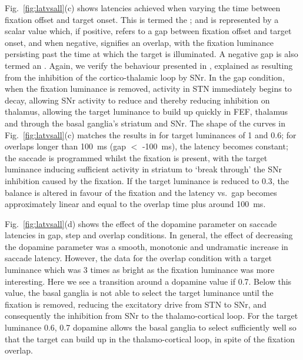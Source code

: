 \documentclass{frontiersSCNS}
\begin{document}
Fig.~\ref{fig:latvsall}(c) shows latencies achieved when varying the
time between fixation offset and target onset. This is termed
the ; and is represented by a scalar value which, if
positive, refers to a gap between fixation offset and target onset,
and when negative, signifies an overlap, with the fixation luminance
persisting past the time at which the target is illuminated. A
negative gap is also termed an .  Again, we verify the
behaviour presented in \cite{cope_basal_2017}, explained as resulting
from the inhibition of the cortico-thalamic loop by SNr. In the gap
condition, when the fixation luminance is removed, activity in STN
immediately begins to decay, allowing SNr activity to reduce and
thereby reducing inhibition on thalamus, allowing the target luminance
to build up quickly in FEF, thalamus and through the basal ganglia's
striatum and SNr. The shape of the curves in Fig.~\ref{fig:latvsall}(c)
matches the results in \cite{cope_basal_2017} for target luminances of
1 and 0.6; for overlaps longer than 100~ms (gap $<$ -100~ms), the
latency becomes constant; the saccade is programmed whilst the
fixation is present, with the target luminance inducing sufficient
activity in striatum to `break through' the SNr inhibition caused by
the fixation. If the target luminance is reduced to 0.3, the balance
is altered in favour of the fixation and the latency vs.~gap becomes
approximately linear and equal to the overlap time plus around 100~ms.

Fig.~\ref{fig:latvsall}(d) shows the effect of the dopamine parameter on
saccade latencies in gap, step and overlap conditions. In general, the
effect of decreasing the dopamine parameter was a smooth, monotonic
and undramatic increase in saccade latency. However, the data for the
overlap condition with a target luminance which was 3 times as bright
as the fixation luminance was more interesting. Here we see a
transition around a dopamine value if 0.7.  Below this value, the
basal ganglia is not able to select the target luminance until the
fixation is removed, reducing the excitatory drive from STN to SNr,
and consequently the inhibition from SNr to the thalamo-cortical
loop. For the target luminance 0.6, 0.7 dopamine allows the basal
ganglia to select sufficiently well so that the target can build up in
the thalamo-cortical loop, in spite of the fixation
overlap.
\end{document}
